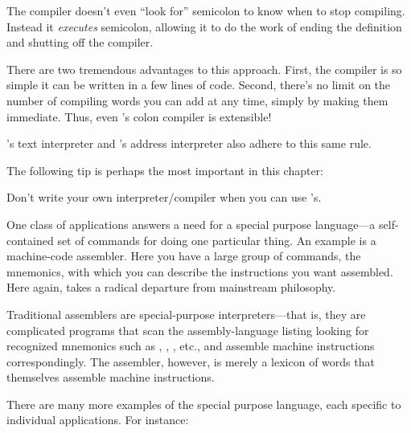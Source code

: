 The compiler doesn't even ``look for'' semicolon to know when to stop
compiling. Instead it \emph{executes} semicolon, allowing it to do the
work of ending the definition and shutting off the compiler.

There are two tremendous advantages to this approach. First, the
compiler is so simple it can be written in a few lines of code. Second,
there's no limit on the number of compiling words you can add at any
time, simply by making them immediate. Thus, even \Forth{}'s colon
compiler is extensible!

\Forth{}'s text interpreter and \Forth{}'s address interpreter also
adhere to this same rule.

The following tip is perhaps the most important in this chapter:


\begin{tip}
Don't write your own interpreter/compiler when you can use \Forth{}'s.
\end{tip}
One class of applications answers a need for a special purpose
language---a self-contained set of commands for doing one particular
thing. An example is a machine-code assembler. Here you have a large
group of commands, the mnemonics, with which you can describe the
instructions you want assembled. Here again, \Forth{} takes a radical
departure from mainstream philosophy.

Traditional assemblers are special-purpose
interpreters---that is, they are complicated programs that scan the
assembly-language listing looking for recognized mnemonics such as
, , , etc., and
assemble machine instructions correspondingly. The \Forth{} assembler,
however, is merely a lexicon of \Forth{} words that themselves assemble
machine instructions.

There are many more examples of the special purpose language,
each specific to individual applications. For instance:

